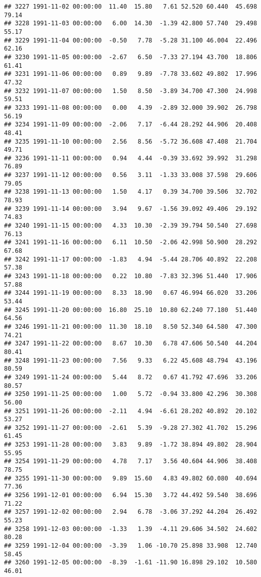 \documentclass{article}\usepackage{graphicx, color}
\makeatletter
\newenvironment{kframe}{%
 \def\at@end@of@kframe{}%
 \ifinner\ifhmode%
  \def\at@end@of@kframe{\end{minipage}}%
  \begin{minipage}{\columnwidth}%
 \fi\fi%
 \def\FrameCommand##1{\hskip\@totalleftmargin \hskip-\fboxsep
 \colorbox{shadecolor}{##1}\hskip-\fboxsep
     \hskip-\linewidth \hskip-\@totalleftmargin \hskip\columnwidth}%
 \MakeFramed {\advance\hsize-\width
   \@totalleftmargin\z@ \linewidth\hsize
   \@setminipage}}%
 {\par\unskip\endMakeFramed%
 \at@end@of@kframe}
\newenvironment{knitrout}{}{} %
\makeatother
\begin{document}
\begin{knitrout}
\begin{kframe}
\begin{verbatim}
## 3227 1991-11-02 00:00:00  11.40  15.80   7.61 52.520 60.440  45.698  79.14
## 3228 1991-11-03 00:00:00   6.00  14.30  -1.39 42.800 57.740  29.498  55.17
## 3229 1991-11-04 00:00:00  -0.50   7.78  -5.28 31.100 46.004  22.496  62.16
## 3230 1991-11-05 00:00:00  -2.67   6.50  -7.33 27.194 43.700  18.806  61.41
## 3231 1991-11-06 00:00:00   0.89   9.89  -7.78 33.602 49.802  17.996  47.32
## 3232 1991-11-07 00:00:00   1.50   8.50  -3.89 34.700 47.300  24.998  59.51
## 3233 1991-11-08 00:00:00   0.00   4.39  -2.89 32.000 39.902  26.798  56.19
## 3234 1991-11-09 00:00:00  -2.06   7.17  -6.44 28.292 44.906  20.408  48.41
## 3235 1991-11-10 00:00:00   2.56   8.56  -5.72 36.608 47.408  21.704  49.71
## 3236 1991-11-11 00:00:00   0.94   4.44  -0.39 33.692 39.992  31.298  76.89
## 3237 1991-11-12 00:00:00   0.56   3.11  -1.33 33.008 37.598  29.606  79.05
## 3238 1991-11-13 00:00:00   1.50   4.17   0.39 34.700 39.506  32.702  78.93
## 3239 1991-11-14 00:00:00   3.94   9.67  -1.56 39.092 49.406  29.192  74.83
## 3240 1991-11-15 00:00:00   4.33  10.30  -2.39 39.794 50.540  27.698  76.13
## 3241 1991-11-16 00:00:00   6.11  10.50  -2.06 42.998 50.900  28.292  67.68
## 3242 1991-11-17 00:00:00  -1.83   4.94  -5.44 28.706 40.892  22.208  57.38
## 3243 1991-11-18 00:00:00   0.22  10.80  -7.83 32.396 51.440  17.906  57.88
## 3244 1991-11-19 00:00:00   8.33  18.90   0.67 46.994 66.020  33.206  53.44
## 3245 1991-11-20 00:00:00  16.80  25.10  10.80 62.240 77.180  51.440  64.56
## 3246 1991-11-21 00:00:00  11.30  18.10   8.50 52.340 64.580  47.300  74.21
## 3247 1991-11-22 00:00:00   8.67  10.30   6.78 47.606 50.540  44.204  80.41
## 3248 1991-11-23 00:00:00   7.56   9.33   6.22 45.608 48.794  43.196  80.59
## 3249 1991-11-24 00:00:00   5.44   8.72   0.67 41.792 47.696  33.206  80.57
## 3250 1991-11-25 00:00:00   1.00   5.72  -0.94 33.800 42.296  30.308  56.00
## 3251 1991-11-26 00:00:00  -2.11   4.94  -6.61 28.202 40.892  20.102  53.27
## 3252 1991-11-27 00:00:00  -2.61   5.39  -9.28 27.302 41.702  15.296  61.45
## 3253 1991-11-28 00:00:00   3.83   9.89  -1.72 38.894 49.802  28.904  55.95
## 3254 1991-11-29 00:00:00   4.78   7.17   3.56 40.604 44.906  38.408  78.75
## 3255 1991-11-30 00:00:00   9.89  15.60   4.83 49.802 60.080  40.694  77.36
## 3256 1991-12-01 00:00:00   6.94  15.30   3.72 44.492 59.540  38.696  71.22
## 3257 1991-12-02 00:00:00   2.94   6.78  -3.06 37.292 44.204  26.492  55.23
## 3258 1991-12-03 00:00:00  -1.33   1.39  -4.11 29.606 34.502  24.602  80.28
## 3259 1991-12-04 00:00:00  -3.39   1.06 -10.70 25.898 33.908  12.740  58.45
## 3260 1991-12-05 00:00:00  -8.39  -1.61 -11.90 16.898 29.102  10.580  46.01

\end{verbatim}
\end{kframe}
\end{knitrout}
\end{document}
